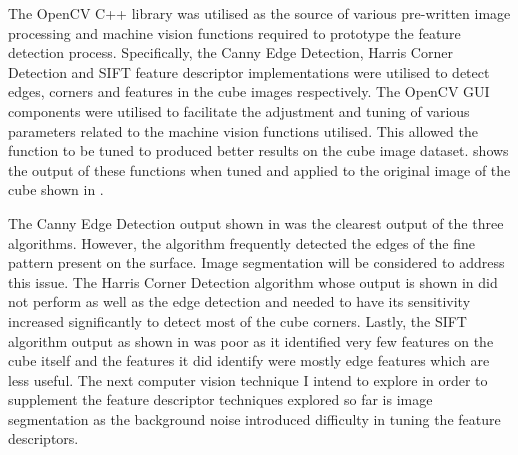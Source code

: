The OpenCV C++ library was utilised as the source of various pre-written image processing and machine vision functions required to prototype the feature detection process. Specifically, the Canny Edge Detection, Harris Corner Detection and SIFT feature descriptor implementations were utilised to detect edges, corners and features in the cube images respectively. The OpenCV GUI components were utilised to facilitate the adjustment and tuning of various parameters related to the machine vision functions utilised. This allowed the function to be tuned to produced better results on the cube image dataset.  shows the output of these functions when tuned and applied to the original image of the cube shown in .

The Canny Edge Detection output shown in  was the clearest output of the three algorithms. However, the algorithm frequently detected the edges of the fine pattern present on the surface. Image segmentation will be considered to address this issue. The Harris Corner Detection algorithm whose output is shown in  did not perform as well as the edge detection and needed to have its sensitivity increased significantly to detect most of the cube corners. Lastly, the \ac{SIFT} algorithm output as shown in  was poor as it identified very few features on the cube itself and the features it did identify were mostly edge features which are less useful. The next computer vision technique I intend to explore in order to supplement the feature descriptor techniques explored so far is image segmentation as the background noise introduced difficulty in tuning the feature descriptors.

\pendsign